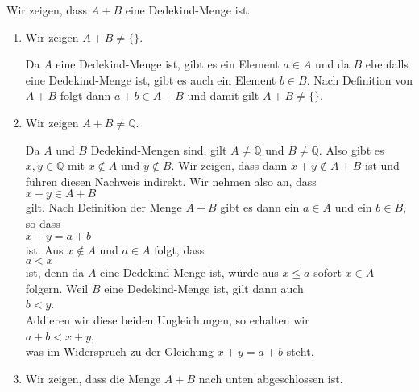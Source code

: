 \solution
Wir zeigen, dass $A + B$ eine Dedekind-Menge ist.
\begin{enumerate}
\item Wir zeigen $A + B \not= \{\}$.

      Da $A$ eine Dedekind-Menge ist, gibt es ein Element $a \in A$ und da $B$ ebenfalls eine
      Dedekind-Menge ist, gibt es auch ein Element $b \in B$.  Nach Definition von $A + B$ folgt dann
      $a + b \in A + B$ und damit gilt $A + B \not= \{\}$.
\pagebreak

\item Wir zeigen $A + B \not= \mathbb{Q}$.

      Da $A$ und $B$ Dedekind-Mengen sind, gilt $A \not= \mathbb{Q}$ und $B \not= \mathbb{Q}$.  Also gibt es 
      $x,y \in \mathbb{Q}$ mit $x \not\in A$ und $y \not\in B$.  Wir zeigen, dass dann  $x + y \not\in A + B$
      ist und f\"uhren diesen Nachweis indirekt.  Wir nehmen also an, dass
      \\[0.2cm]
      \hspace*{1.3cm}
      $x + y \in A + B$
      \\[0.2cm]
      gilt.  Nach Definition der Menge $A + B$ gibt es dann ein $a \in A$ und ein $b \in B$, so dass
      \\[0.2cm]
      \hspace*{1.3cm}
      $x + y = a + b$
      \\[0.2cm]
      ist.  Aus $x \not\in A$ und $a \in A$ folgt, dass 
      \\[0.2cm]
      \hspace*{1.3cm}
      $a < x$ 
      \\[0.2cm]
      ist, denn da $A$ eine Dedekind-Menge ist, w\"urde aus $x \leq a$ sofort $x \in A$ folgern.  Weil $B$ eine
      Dedekind-Menge ist, gilt dann auch
      \\[0.2cm]
      \hspace*{1.3cm}
      $b < y$.
      \\[0.2cm]
      Addieren wir diese beiden Ungleichungen, so erhalten wir
      \\[0.2cm]
      \hspace*{1.3cm}
      $a + b < x + y$,
      \\[0.2cm]
      was im Widerspruch zu der Gleichung $x + y = a + b$ steht.
\item Wir zeigen, dass die Menge $A + B$ nach unten abgeschlossen ist.


\end{enumerate}
